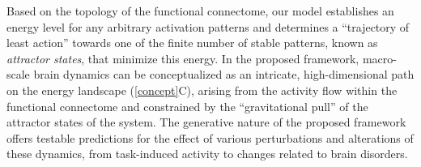 \documentclass{article}
\begin{document}
Based on the topology of the functional connectome, our model establishes an energy level for any arbitrary activation patterns and determines a ``trajectory of least action'' towards one of the finite number of stable patterns, known as \textit{attractor states}, that minimize this energy. In the proposed framework, macro-scale brain dynamics can be conceptualized as an intricate, high-dimensional path on the energy landscape (\ref{concept}C), arising from the activity flow \citep{cole2016activity} within the functional connectome and constrained by the ``gravitational pull'' of the attractor states of the system.
The generative nature of the proposed framework offers testable predictions for the effect of various perturbations and alterations of these dynamics, from task-induced activity to changes related to brain disorders.
\printglossaries






\end{document}
